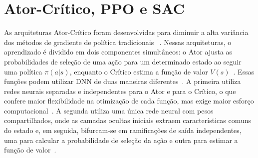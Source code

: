 \section*{Ator-Crítico, \texorpdfstring{\gls{PPO}}{\gls{PPO}} e \texorpdfstring{\gls{SAC}}{\gls{SAC}}} 

As arquiteturas Ator-Crítico foram desenvolvidas para diminuir a alta variância dos métodos de gradiente de política tradicionais ~\cite{sutton2018}. Nessas arquiteturas, o aprendizado é dividido em dois componentes simultâneos: o Ator ajusta as probabilidades de seleção de uma ação para um determinado estado ao seguir uma política $\pi(a|s)$, enquanto o Crítico estima a função de valor $V(s)$~\cite{sutton2018}. Essas funções podem utilizar \gls{DNN} de duas maneiras diferentes~\cite{hu2024}. A primeira utiliza redes neurais separadas e independentes para o Ator e para o Crítico, o que confere maior flexibilidade na otimização de cada função, mas exige maior esforço computacional~\cite{hu2024}. A segunda utiliza uma única rede neural com pesos compartilhados, onde as camadas ocultas iniciais extraem características comuns do estado e, em seguida, bifurcam-se em ramificações de saída independentes, uma para calcular a probabilidade de seleção da ação e outra para estimar a função de valor~\cite{hu2024}.


